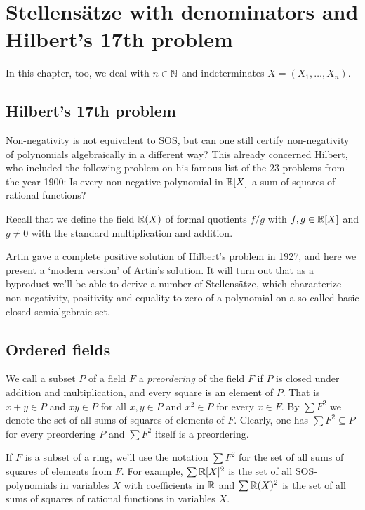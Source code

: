 \section{Stellensätze with denominators and Hilbert's 17th problem}

In this chapter, too, we deal with $n \in \mathbb{N}$ and indeterminates $X=(X_1,\ldots,X_n)$.

\subsection{Hilbert's 17th problem}

Non-negativity is not equivalent to SOS, but can one still certify non-negativity of polynomials algebraically in a different way? This already concerned Hilbert, who included the following problem on his famous list of the 23 problems from the year 1900: Is every non-negative polynomial in $\mathbb{R}[X]$ a sum of squares of rational functions?

Recall that we define the field $\mathbb{R}(X)$ of formal quotients $f / g$ with $f, g \in \mathbb{R}[X]$ and $g \ne 0$ with the standard multiplication and addition. 

Artin gave a complete positive solution of Hilbert's problem in 1927, and here we present a `modern version' of Artin's solution. It will turn out that as a byproduct we'll be able to derive a number of Stellensätze, which characterize non-negativity, positivity and equality to zero of a polynomial on a so-called basic closed semialgebraic set.

\subsection{Ordered fields}

We call a subset $P$ of a field $F$ a \emph{preordering} of the field $F$ if $P$ is closed under addition and multiplication, and every square is an element of $P$. That is $x+y \in P$ and $x y \in P$ for all $x, y \in P$ and $x^2 \in P$ for every $x \in F$. By $\sum F^2$ we denote the set of all sums of squares of elements of $F$. Clearly, one has $\sum F^2 \subseteq P$ for every preordering $P$ and $\sum F^2$ itself is a preordering.

If $F$ is a subset of a ring, we'll use the notation $\sum F^2$ for the set of all sums of squares of elements from $F$. For example, $\sum \mathbb{R}[X]^2$ is the set of all SOS-polynomials in variables $X$ with coefficients in $\mathbb{R}$ and $\sum \mathbb{R}(X)^2$ is the set of all sums of squares of rational functions in variables $X$.

